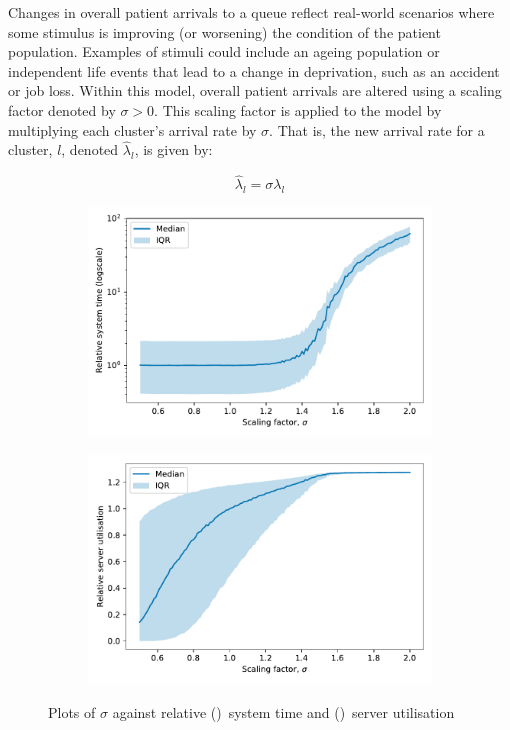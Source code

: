 Changes in overall patient arrivals to a queue reflect real-world scenarios
where some stimulus is improving (or worsening) the condition of the patient
population. Examples of stimuli could include an ageing population or
independent life events that lead to a change in deprivation, such as an
accident or job loss. Within this model, overall patient arrivals are altered
using a scaling factor denoted by \(\sigma > 0\). This scaling factor is applied
to the model by multiplying each cluster's arrival rate by \(\sigma\). That is,
the new arrival rate for a cluster, \(l\), denoted \(\hat\lambda_l\), is given
by:

\begin{equation}\label{eq:lambda}
    \hat\lambda_{l} = \sigma\lambda_l
\end{equation}

\begin{figure}
    \centering
    \begin{subfigure}{\imgwidth}
        \includegraphics[width=\linewidth]{lambda_time}
        \caption{}\label{fig:lambda_time}
    \end{subfigure}

    \begin{subfigure}{\imgwidth}
        \includegraphics[width=\linewidth]{lambda_util}
        \caption{}\label{fig:lambda_util}
    \end{subfigure}
    \caption{%
        Plots of \(\sigma\) against relative ()~system
        time and ()~server utilisation
    }\label{fig:lambda}
\end{figure}

